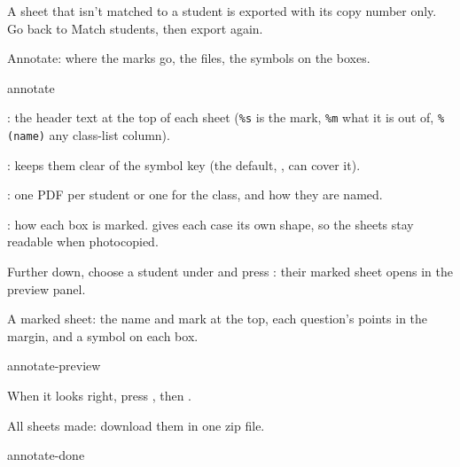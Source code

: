 \documentclass[11pt]{article}
\begin{document}
\begin{careful}
A sheet that isn't matched to a student is exported with its copy number only. Go back to Match students, then export again.
\end{careful}

\label{step:annotate}

\begin{keep}
\begin{guidefig}{Annotate: where the marks go, the files, the symbols on the boxes.}
\begin{shot}{annotate}
\end{shot}
\end{guidefig}
\begin{callouts}
  \item {}: the header text at the top of each sheet (\texttt{\%s} is the mark, \texttt{\%m} what it is out of, \texttt{\%(name)} any class-list column).
  \item {}:  keeps them clear of the symbol key (the default, , can cover it).
  \item {}: one PDF per student or one for the class, and how they are named.
  \item {}: how each box is marked.  gives each case its own shape, so the sheets stay readable when photocopied.
\end{callouts}
\end{keep}

Further down, choose a student under  and press : their marked sheet opens in the preview panel.

\begin{guidefig}{A marked sheet: the name and mark at the top, each question's points in the margin, and a symbol on each box.}
\begin{shot}{annotate-preview}
\end{shot}
\end{guidefig}

When it looks right, press , then .

\begin{guidefig}{All sheets made: download them in one zip file.}
\begin{shot}{annotate-done}
\end{shot}
\end{guidefig}
\end{document}
